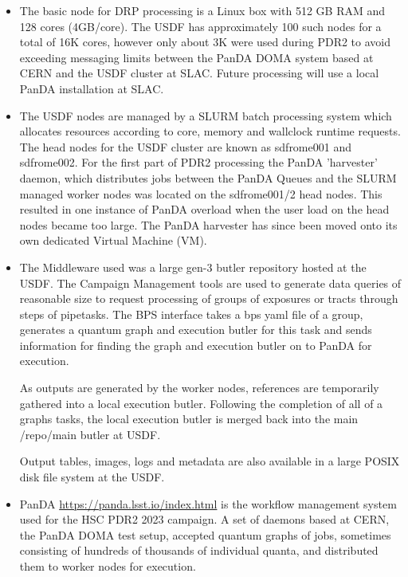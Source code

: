 \begin{itemize}
	\item The basic node for DRP processing is a Linux box with 512 GB RAM and
128 cores (4GB/core).  The USDF has approximately 100 such nodes for
a total of 16K cores, however only about 3K were used during PDR2 to avoid
exceeding messaging limits between the PanDA DOMA system based at CERN 
and the USDF cluster at SLAC.  Future processing will use a local
PanDA installation at SLAC.  
		
	\item The USDF nodes are managed by a SLURM batch
processing system which allocates resources according to core, memory and 
wallclock runtime requests.  The head nodes for the USDF cluster are 
known as sdfrome001 and sdfrome002.  For the first part of PDR2
processing the PanDA 'harvester' daemon, which distributes jobs between the
PanDA Queues and the SLURM managed worker nodes was located on the sdfrome001/2
head nodes.  This resulted in one instance of PanDA overload when the user load
on the head nodes became too large.  The PanDA harvester has since been
moved onto its own dedicated Virtual Machine (VM).


	\item The Middleware used was a large gen-3 butler repository hosted
	at the USDF.   The Campaign Management tools are used to 
			generate data queries of reasonable size to 
			request processing of groups of exposures or tracts
			through steps of pipetasks.  The BPS interface
			takes a bps yaml file of a group, generates a
			quantum graph and execution butler for this
			task and sends information for finding the graph
			and execution butler on to PanDA for execution.

		As outputs are generated by the worker nodes, references are 
		temporarily gathered into a local execution butler.
		Following the completion of all of a graphs tasks,
		the local execution butler is merged back into
			the main /repo/main butler at USDF.

			Output tables, images, logs and metadata are 
			also available in a large POSIX disk file system
				at the USDF.

	\item PanDA \url{https://panda.lsst.io/index.html} is the workflow management system used for the HSC PDR2 2023 campaign.
A set of daemons based at CERN, the PanDA DOMA test setup, accepted quantum
graphs of jobs,  sometimes consisting of hundreds of thousands of individual
quanta, and distributed them to worker nodes for execution.
\end{itemize}

